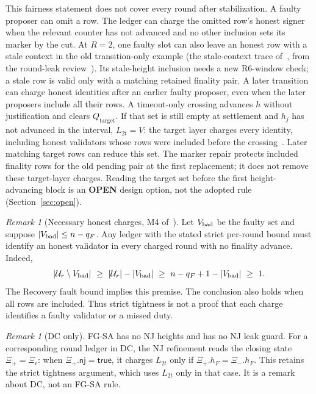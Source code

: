 \documentclass{article}
\theoremstyle{plain}
\theoremstyle{definition}
\theoremstyle{remark}
\newtheorem{remark}[theorem]{Remark}
\newcommand{\Qtarget}{Q_{\mathrm{target}}}
\newcommand{\nj}{\mathsf{nj}}
\newcommand{\OPEN}{\textbf{OPEN}}
\begin{document}
This fairness statement does not cover every round after stabilization.
A faulty proposer can omit a row.  The ledger can charge the omitted row's
honest signer when the relevant counter has not advanced and no other
inclusion sets its marker by the cut.  At $R=2$, one faulty slot can also
leave an honest row with a stale context in the old transition-only
example (the stale-context trace of~\cite[\S6, M2]{LS183},
from the round-leak review~\cite{RLR}).  Its stale-height inclusion
needs a new R6-window check; a stale row is valid only with a matching
retained finality pair.
A later transition can charge honest identities after an earlier faulty
proposer, even when the later proposers include all their rows.
A timeout-only crossing advances $h$ without justification and clears
$\Qtarget$.  If that set is still empty at settlement and $h_j$ has
not advanced in the interval, $L_{2t}=V$: the target layer charges every
identity, including honest validators whose rows were included before
the crossing~\cite[\S3.2]{RL179}.  Later matching target rows can
reduce this set.  The marker repair protects included finality rows
for the old pending pair at the first replacement; it does not remove
these target-layer charges.  Reading the target set before the first
height-advancing block is an \OPEN{} design option, not the adopted
rule (Section~\ref{sec:open}).

\begin{remark}[Necessary honest charges, M4 of~\cite{RLR,LS183}]
Let $V_{\rm bad}$ be the faulty set and suppose
$|V_{\rm bad}|\leq n-q_F$.  Any ledger with the stated strict per-round
bound must identify an honest validator in every charged round with
no finality advance.  Indeed,
\[
 |\mathcal U_r\setminus V_{\rm bad}|
 \ \geq\ |\mathcal U_r|-|V_{\rm bad}|
 \ \geq\ n-q_F+1-|V_{\rm bad}|\ \geq\ 1.
\]
The Recovery fault bound implies this premise.  The conclusion also
holds when all rows are included.  Thus strict tightness is not a
proof that each charge identifies a faulty validator or a missed duty.
\end{remark}

\begin{remark}[DC only]
FG-SA has no NJ heights and has no NJ leak guard.  For a corresponding
round ledger in DC, the NJ refinement reads the closing state
$\Xi_+=\Xi_r$: when $\Xi_+.\nj=\mathsf{true}$, it charges $L_{2t}$ only if
$\Xi_+.h_F=\Xi_-.h_F$.  This retains the strict tightness
argument, which uses $L_{2t}$ only in that case.  It is a remark about
DC, not an FG-SA rule.
\end{remark}
\end{document}
